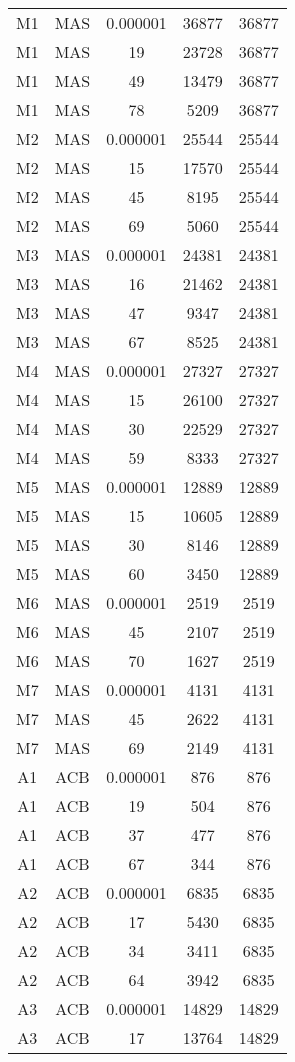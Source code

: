 \begin{center}
\begin{longtable}{ccccc}
\hline \hline
\endlastfoot	
M1	&	MAS	&	0.000001	&	36877	&	36877	\\
M1	&	MAS	&	19	&	23728	&	36877	\\
M1	&	MAS	&	49	&	13479	&	36877	\\
M1	&	MAS	&	78	&	5209	&	36877	\\
M2	&	MAS	&	0.000001	&	25544	&	25544	\\
M2	&	MAS	&	15	&	17570	&	25544	\\
M2	&	MAS	&	45	&	8195	&	25544	\\
M2	&	MAS	&	69	&	5060	&	25544	\\
M3	&	MAS	&	0.000001	&	24381	&	24381	\\
M3	&	MAS	&	16	&	21462	&	24381	\\
M3	&	MAS	&	47	&	9347	&	24381	\\
M3	&	MAS	&	67	&	8525	&	24381	\\
M4	&	MAS	&	0.000001	&	27327	&	27327	\\
M4	&	MAS	&	15	&	26100	&	27327	\\
M4	&	MAS	&	30	&	22529	&	27327	\\
M4	&	MAS	&	59	&	8333	&	27327	\\
M5	&	MAS	&	0.000001	&	12889	&	12889	\\
M5	&	MAS	&	15	&	10605	&	12889	\\
M5	&	MAS	&	30	&	8146	&	12889	\\
M5	&	MAS	&	60	&	3450	&	12889	\\
M6	&	MAS	&	0.000001	&	2519	&	2519	\\
M6	&	MAS	&	45	&	2107	&	2519	\\
M6	&	MAS	&	70	&	1627	&	2519	\\
M7	&	MAS	&	0.000001	&	4131	&	4131	\\
M7	&	MAS	&	45	&	2622	&	4131	\\
M7	&	MAS	&	69	&	2149	&	4131	\\
A1	&	ACB	&	0.000001	&	876	&	876	\\
A1	&	ACB	&	19	&	504	&	876	\\
A1	&	ACB	&	37	&	477	&	876	\\
A1	&	ACB	&	67	&	344	&	876	\\
A2	&	ACB	&	0.000001	&	6835	&	6835	\\
A2	&	ACB	&	17	&	5430	&	6835	\\
A2	&	ACB	&	34	&	3411	&	6835	\\
A2	&	ACB	&	64	&	3942	&	6835	\\
A3	&	ACB	&	0.000001	&	14829	&	14829	\\
A3	&	ACB	&	17	&	13764	&	14829	\\

\end{longtable}
\end{center}
